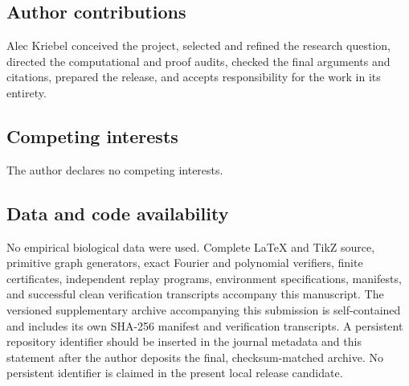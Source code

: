 \subsection*{Author contributions}

Alec Kriebel conceived the project, selected and refined the research question, directed the computational and proof audits, checked the final arguments and citations, prepared the release, and accepts responsibility for the work in its entirety.

\subsection*{Competing interests}

The author declares no competing interests.

\subsection*{Data and code availability}

No empirical biological data were used.  Complete LaTeX and TikZ source, primitive graph generators, exact Fourier and polynomial verifiers, finite certificates, independent replay programs, environment specifications, manifests, and successful clean verification transcripts accompany this manuscript.  The versioned supplementary archive accompanying this submission is self-contained and includes its own SHA-256 manifest and verification transcripts.  A persistent repository identifier should be inserted in the journal metadata and this statement after the author deposits the final, checksum-matched archive.  No persistent identifier is claimed in the present local release candidate.
